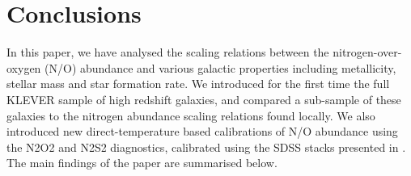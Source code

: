 \documentclass[usenatbib]{mnras} %
\begin{document}
\section{Conclusions}\label{Conc}


In this paper, we have analysed the scaling relations between the nitrogen-over-oxygen (N/O) abundance and various galactic properties including metallicity, stellar mass and star formation rate. We introduced for the first time the full KLEVER sample of high redshift galaxies, and compared a sub-sample of these galaxies to the nitrogen abundance scaling relations found locally. We also introduced new direct-temperature based calibrations of N/O abundance using the N2O2 and N2S2 diagnostics, calibrated using the SDSS stacks presented in \cite{Curti_2017}. The main findings of the paper are summarised below. 
\end{document}
